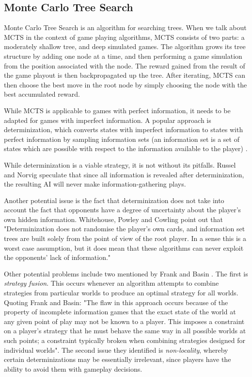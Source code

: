 \clearpage
\subsection{Monte Carlo Tree Search}
\label{rw:mcts}

Monte Carlo Tree Search \cite{Chaslot10} is an algorithm for searching trees.
When we talk about MCTS in the context of game playing algorithms, MCTS
consists of two parts: a moderately shallow tree, and deep simulated games.
The algorithm grows its tree structure by adding one node at a time, and then
performing a game simulation from the position associated with the node.
The reward gained from the result of the game playout is then backpropagated
up the tree. After iterating, MCTS can then choose the best move in the root
node by simply choosing the node with the best accumulated reward.

While MCTS is applicable to games with perfect information, it needs to be adapted
for games with imperfect information. A popular approach is determinization,
which converts states with imperfect information to states with perfect information
by sampling information sets (an information set is a set of states
which are possible with respect to the information available to the player)
\cite{Cowling12}.

While determinization is a viable strategy, it is not without its pitfalls.
Russel and Norvig speculate that since all information is revealed after
determinization, the resulting AI will never make information-gathering
plays. \cite{Russell09}

Another potential issue is the fact that determinization does not take into account
the fact that opponents have a degree of uncertainty about the player's own hidden information.
Whitehouse, Powley and Cowling point out that "Determinization does not randomise the
player's own cards, and information set trees are built solely
from the point of view of the root player. In a sense this is a
worst case assumption, but it does mean that these
algorithms can never exploit the opponents' lack of
information." \cite{Whitehouse11}

Other potential problems include two mentioned by Frank and Basin \cite{Frank98}.
The first is \emph{strategy fusion}. This occurs whenever an algorithm attempts to combine
strategies from particular worlds to produce an optimal strategy for all worlds.
Quoting Frank and Basin: "The flaw in this approach
occurs because of the property of incomplete information games that the exact state
of the world at any given point of play may not be known to a player. This imposes
a constraint on a player's strategy that he must behave the same way in all possible
worlds at such points; a constraint typically broken when combining strategies designed
for individual worlds". The second issue they identified is \emph{non-locality},
whereby certain determinizations may be essentially irrelevant, since players have
the ability to avoid them with gameplay decisions.

